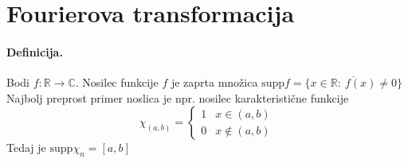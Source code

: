 \documentclass[a4paper]{article}
\newcommand{\C}{\mathbb{C}}
\newcommand{\R}{\mathbb{R}}
\newcommand{\fn}[3]{{#1}\colon {#2} \rightarrow {#3}}
\begin{document}
\section{Fourierova transformacija}
\paragraph{Definicija.} Bodi $\fn{f}{\R}{\C}$. Nosilec funkcije $f$ je zaprta množica $\mathrm{supp}f = \overline{\{x \in \R:~f(x)\neq0\}}$
Najbolj preprost primer noslica je npr. nosilec karakteristične funkcije $$\chi_{(a, b)} = \begin{cases}
    1 & x \in (a, b) \\
    0 & x \notin (a, b)
\end{cases}$$
Tedaj je $\mathrm{supp} \chi_{n} = [a, b]$
\end{document}
